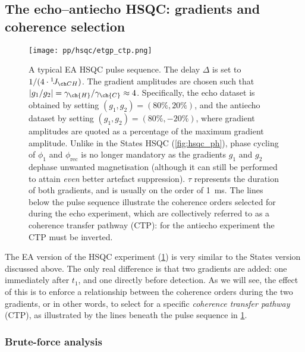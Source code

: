 \subsection{The echo--antiecho HSQC: gradients and coherence selection}
\label{subsec:theory__hsqc_ea}

\begin{figure}[!ht]
    \centering
    \texttt{[image: pp/hsqc/etgp\_ctp.png]}%
    \caption[Echo--antiecho HSQC pulse sequence]{
        A typical EA HSQC pulse sequence.
        The delay $\Delta$ is set to $1/(4 \cdot \oneJ{CH})$.
        The gradient amplitudes are chosen such that $|g_1/g_2| = \gamma_{\ch{H}}/\gamma_{\ch{C}} \approx 4$.
        Specifically, the echo dataset is obtained by setting $(g_1, g_2) = (80\%, 20\%)$, and the antiecho dataset by setting $(g_1, g_2) = (80\%, -20\%)$, where gradient amplitudes are quoted as a percentage of the maximum gradient amplitude.
        Unlike in the States HSQC (\cref{fig:hsqc_ph}), phase cycling of $\phi_1$ and $\phi_\text{rec}$ is no longer mandatory as the gradients $g_1$ and $g_2$ dephase unwanted magnetisation (although it can still be performed to attain \textit{even} better artefact suppression).
        $\tau$ represents the duration of both gradients, and is usually on the order of \qty{1}{ms}.
        The lines below the pulse sequence illustrate the coherence orders selected for during the echo experiment, which are collectively referred to as a coherence transfer pathway (CTP): for the antiecho experiment the \carbon{} CTP must be inverted.
    }
    \label{fig:hsqc_etgp}
\end{figure}

The EA version of the HSQC experiment (\cref{fig:hsqc_etgp}) is very similar to the States version discussed above.
The only real difference is that two gradients are added: one immediately after $t_1$, and one directly before detection.
As we will see, the effect of this is to enforce a relationship between the coherence orders during the two gradients, or in other words, to select for a specific \textit{coherence transfer pathway} (CTP), as illustrated by the lines beneath the pulse sequence in \cref{fig:hsqc_etgp}.


\subsubsection{Brute-force analysis}


